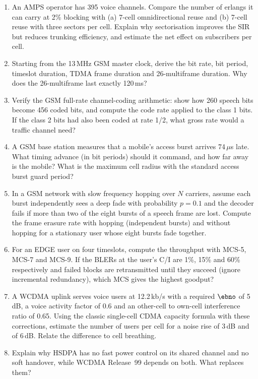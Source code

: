\problems
\begin{enumerate}[label=\thechapter.\arabic*]
\item An AMPS operator has 395 voice channels. Compare the number of erlangs it can carry at 2\%
blocking with (a) 7-cell omnidirectional reuse and (b) 7-cell reuse with three sectors per cell.
Explain why sectorisation improves the SIR but reduces trunking efficiency, and estimate the net
effect on subscribers per cell.
\item Starting from the 13\,MHz GSM master clock, derive the bit rate, bit period, timeslot duration,
TDMA frame duration and 26-multiframe duration. Why does the 26-multiframe last exactly 120\,ms?
\item Verify the GSM full-rate channel-coding arithmetic: show how 260 speech bits become 456 coded
bits, and compute the code rate applied to the class 1 bits. If the class 2 bits had also been coded
at rate 1/2, what gross rate would a traffic channel need?
\item A GSM base station measures that a mobile's access burst arrives 74\,$\mu$s late. What timing
advance (in bit periods) should it command, and how far away is the mobile? What is the maximum cell
radius with the standard access burst guard period?
\item In a GSM network with slow frequency hopping over $N$ carriers, assume each burst independently
sees a deep fade with probability $p=0.1$ and the decoder fails if more than two of the eight bursts
of a speech frame are lost. Compute the frame erasure rate with hopping (independent bursts) and
without hopping for a stationary user whose eight bursts fade together.
\item For an EDGE user on four timeslots, compute the throughput with MCS-5, MCS-7 and MCS-9. If the
BLERs at the user's C/I are 1\%, 15\% and 60\% respectively and failed blocks are retransmitted until
they succeed (ignore incremental redundancy), which MCS gives the highest goodput?
\item A WCDMA uplink serves voice users at 12.2\,kb/s with a required $\ebno$ of 5\,dB, a voice
activity factor of 0.6 and an other-cell to own-cell interference ratio of 0.65. Using the classic
single-cell CDMA capacity formula with these corrections, estimate the number of users per cell for a
noise rise of 3\,dB and of 6\,dB. Relate the difference to cell breathing.
\item Explain why HSDPA has no fast power control on its shared channel and no soft handover, while
WCDMA Release~99 depends on both. What replaces them?

\end{enumerate}
